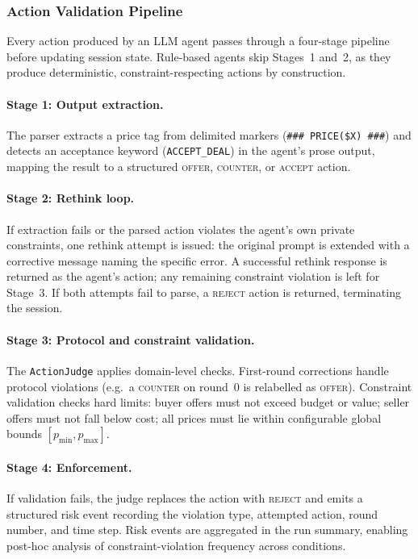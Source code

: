 \subsubsection{Action Validation Pipeline}
\label{sec:validation}

Every action produced by an LLM agent passes through a four-stage pipeline before updating session state.  Rule-based agents skip Stages~1 and~2, as they produce deterministic, constraint-respecting actions by construction.

\paragraph{Stage 1: Output extraction.}
The parser extracts a price tag from delimited markers (\texttt{\#\#\# PRICE(\$X) \#\#\#}) and detects an acceptance keyword (\texttt{ACCEPT\_DEAL}) in the agent's prose output, mapping the result to a structured \textsc{offer}, \textsc{counter}, or \textsc{accept} action.

\paragraph{Stage 2: Rethink loop.}
If extraction fails or the parsed action violates the agent's own private constraints, one rethink attempt is issued: the original prompt is extended with a corrective message naming the specific error.  A successful rethink response is returned as the agent's action; any remaining constraint violation is left for Stage~3.  If both attempts fail to parse, a \textsc{reject} action is returned, terminating the session.

\paragraph{Stage 3: Protocol and constraint validation.}
The \texttt{ActionJudge} applies domain-level checks.  First-round corrections handle protocol violations (e.g.\ a \textsc{counter} on round~0 is relabelled as \textsc{offer}).  Constraint validation checks hard limits: buyer offers must not exceed budget or value; seller offers must not fall below cost; all prices must lie within configurable global bounds $[p_{\min}, p_{\max}]$.

\paragraph{Stage 4: Enforcement.}
If validation fails, the judge replaces the action with \textsc{reject} and emits a structured risk event recording the violation type, attempted action, round number, and time step.  Risk events are aggregated in the run summary, enabling post-hoc analysis of constraint-violation frequency across conditions.

